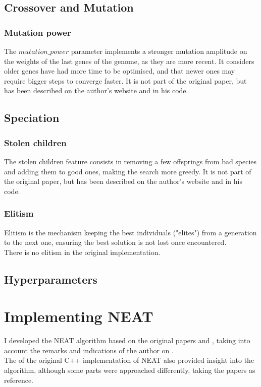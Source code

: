\subsection{Crossover and Mutation}

\subsubsection{Mutation power}

The $mutation\_power$ parameter implements a stronger mutation amplitude on the weights of the last genes of the genome, as they are more recent. It considers older genes have had more time to be optimised, and that newer ones may require bigger steps to converge faster. It is not part of the original paper, but has been described on the author's website and in his code.

\subsection{Speciation}

\subsubsection{Stolen children}
The stolen children feature consists in removing a few offsprings from bad species and adding them to good ones, making the search more greedy. It is not part of the original paper, but has been described on the author's website and in his code.

\subsubsection{Elitism}
Elitism is the mechanism keeping the best individuals ("elites") from a generation to the next one, ensuring the best solution is not lost once encountered. \\
There is no elitism in the original implementation.

\subsection{Hyperparameters}


\section{Implementing NEAT}
I developed the NEAT algorithm based on the original papers \cite{NEAT_1} and \cite{NEAT_2}, taking into account the remarks and indications of the author on . \\
The  of the original C++ implementation of NEAT also provided insight into the algorithm, although some parts were approached differently, taking the papers as reference.

